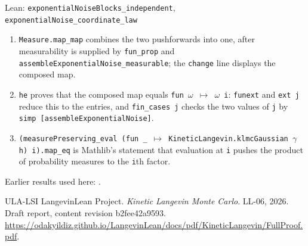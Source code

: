\documentclass[11pt,a4paper]{article}
\begin{document}
\begin{leanbox}{Lean: \texttt{exponentialNoiseBlocks\_\allowbreak{}independent}, \texttt{exponentialNoise\_\allowbreak{}coordinate\_\allowbreak{}law}}
\begin{enumerate}


\item \texttt{Measure.\allowbreak{}map\_\allowbreak{}map} combines the two pushforwards into one, after measurability is supplied by \texttt{fun\_\allowbreak{}prop} and \texttt{assemble\allowbreak{}Exponential\allowbreak{}Noise\_\allowbreak{}measurable}; the \texttt{change} line displays the composed map.

\item \texttt{he} proves that the composed map equals \texttt{fun \ensuremath{\omega} \ensuremath{\mapsto} \ensuremath{\omega} i}: \texttt{funext} and \texttt{ext j} reduce this to the entries, and \texttt{fin\_\allowbreak{}cases j} checks the two values of \texttt{j} by \texttt{simp [assemble\allowbreak{}Exponential\allowbreak{}Noise]}.

\item \texttt{(measure\allowbreak{}Preserving\_\allowbreak{}eval (fun \_\allowbreak{} \ensuremath{\mapsto} Kinetic\allowbreak{}Langevin.\allowbreak{}klmc\allowbreak{}Gaussian \ensuremath{\gamma} h) i).\allowbreak{}map\_\allowbreak{}eq} is Mathlib's statement that evaluation at \texttt{i} pushes the product of probability measures to the \texttt{i}th factor.

\end{enumerate}
\end{leanbox}


Earlier results used here: \cite[Section~3.26.3]{LangevinLean2026Kinetic}.

\begin{thebibliography}{ULA-LSI}
LangevinLean Project. \emph{Kinetic Langevin Monte Carlo}. LL-06, 2026. Draft report, content revision b2fee42a9593. \url{https://odakyildiz.github.io/LangevinLean/docs/pdf/KineticLangevin/FullProof.pdf}.
\end{thebibliography}
\end{document}
